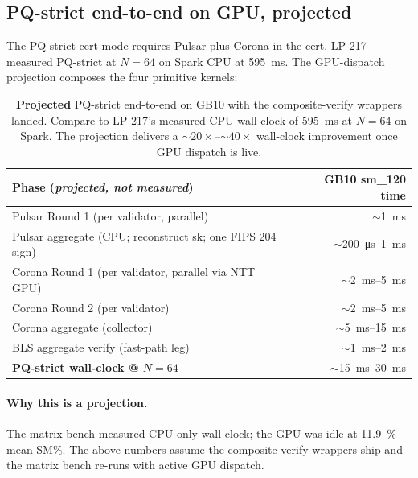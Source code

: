 \subsection{PQ-strict end-to-end on GPU, projected}

The PQ-strict cert mode requires Pulsar plus Corona in the cert.
LP-217 measured PQ-strict at $N{=}64$ on Spark CPU at
\SI{595}{\milli\second}. The GPU-dispatch projection composes
the four primitive kernels:

\begin{table}[h]
\centering
\small
\begin{tabular}{@{}lr@{}}
\toprule
\textbf{Phase (\emph{projected, not measured})}
  & \textbf{GB10 sm\_120 time} \\
\midrule
Pulsar Round 1 (per validator, parallel) &
  $\sim$\SI{1}{\milli\second} \\
Pulsar aggregate (CPU; reconstruct sk; one FIPS 204 sign) &
  $\sim$\SI{200}{\micro\second}--\SI{1}{\milli\second} \\
Corona Round 1 (per validator, parallel via NTT GPU) &
  $\sim$\SI{2}{\milli\second}--\SI{5}{\milli\second} \\
Corona Round 2 (per validator) & $\sim$\SI{2}{\milli\second}--\SI{5}{\milli\second} \\
Corona aggregate (collector) & $\sim$\SI{5}{\milli\second}--\SI{15}{\milli\second} \\
BLS aggregate verify (fast-path leg) & $\sim$\SI{1}{\milli\second}--\SI{2}{\milli\second} \\
\midrule
\textbf{PQ-strict wall-clock @ $N{=}64$}
  & $\sim$\SI{15}{\milli\second}--\SI{30}{\milli\second} \\
\bottomrule
\end{tabular}
\caption{\textbf{Projected} PQ-strict end-to-end on GB10 with
the composite-verify wrappers landed. Compare to LP-217's
measured CPU wall-clock of \SI{595}{\milli\second} at $N{=}64$
on Spark. The projection delivers a $\sim 20\times$--$\sim 40\times$
wall-clock improvement once GPU dispatch is live.}
\label{tab:pqstrict-projected}
\end{table}

\paragraph{Why this is a projection.} The matrix bench
\cite{matrixbench} measured CPU-only wall-clock; the GPU was
idle at \SI{11.9}{\percent} mean SM\%. The above numbers
assume the composite-verify wrappers ship and the matrix bench
re-runs with active GPU dispatch.


